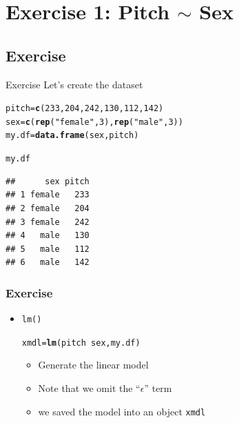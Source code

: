\documentclass[10p]{beamer}\usepackage[]{graphicx}\usepackage[]{color}
\makeatletter
\newcommand{\hlnum}[1]{\textcolor[rgb]{0.686,0.059,0.569}{#1}}%
\newcommand{\hlstr}[1]{\textcolor[rgb]{0.192,0.494,0.8}{#1}}%
\newcommand{\hlopt}[1]{\textcolor[rgb]{0,0,0}{#1}}%
\newcommand{\hlstd}[1]{\textcolor[rgb]{0.345,0.345,0.345}{#1}}%
\newcommand{\hlkwb}[1]{\textcolor[rgb]{0.69,0.353,0.396}{#1}}%
\newcommand{\hlkwd}[1]{\textcolor[rgb]{0.737,0.353,0.396}{\textbf{#1}}}%
\newenvironment{kframe}{%
 \def\at@end@of@kframe{}%
 \ifinner\ifhmode%
  \def\at@end@of@kframe{\end{minipage}}%
  \begin{minipage}{\columnwidth}%
 \fi\fi%
 \def\FrameCommand##1{\hskip\@totalleftmargin \hskip-\fboxsep
 \colorbox{shadecolor}{##1}\hskip-\fboxsep
     \hskip-\linewidth \hskip-\@totalleftmargin \hskip\columnwidth}%
 \MakeFramed {\advance\hsize-\width
   \@totalleftmargin\z@ \linewidth\hsize
   \@setminipage}}%
 {\par\unskip\endMakeFramed%
 \at@end@of@kframe}
\newenvironment{knitrout}{}{} %
\makeatother
\begin{document}
\section[Exercise1]{Exercise 1: Pitch $\sim$ Sex}
\subsection{Exercise}

\begin{frame}[fragile]{Exercise}
Let's create the dataset
\begin{knitrout}
\color{fgcolor}\begin{kframe}
\begin{alltt}
\hlstd{pitch} \hlkwb{=} \hlkwd{c}\hlstd{(}\hlnum{233}\hlstd{,}\hlnum{204}\hlstd{,}\hlnum{242}\hlstd{,}\hlnum{130}\hlstd{,}\hlnum{112}\hlstd{,}\hlnum{142}\hlstd{)}
\hlstd{sex} \hlkwb{=} \hlkwd{c}\hlstd{(}\hlkwd{rep}\hlstd{(}\hlstr{"female"}\hlstd{,}\hlnum{3}\hlstd{),}\hlkwd{rep}\hlstd{(}\hlstr{"male"}\hlstd{,}\hlnum{3}\hlstd{))}
\hlstd{my.df} \hlkwb{=} \hlkwd{data.frame}\hlstd{(sex, pitch)}
\end{alltt}
\end{kframe}
\end{knitrout}

\pause

\begin{knitrout}
\color{fgcolor}\begin{kframe}
\begin{alltt}
\hlstd{my.df}
\end{alltt}
\begin{verbatim}
##      sex pitch
## 1 female   233
## 2 female   204
## 3 female   242
## 4   male   130
## 5   male   112
## 6   male   142
\end{verbatim}
\end{kframe}
\end{knitrout}
\end{frame}

\begin{frame}[fragile]
\frametitle{Exercise}
\begin{itemize}
\item \texttt{lm()}
\begin{knitrout}
\color{fgcolor}\begin{kframe}
\begin{alltt}
\hlstd{xmdl} \hlkwb{=} \hlkwd{lm}\hlstd{(pitch} \hlopt{~} \hlstd{sex, my.df)}
\end{alltt}
\end{kframe}
\end{knitrout}
	\begin{itemize}
	\item Generate the linear model
	\item Note that we omit the ``$\epsilon$'' term 
	\item we saved the model into an object \texttt{xmdl}
	\end{itemize}
\end{itemize}
\end{frame}
\end{document}
